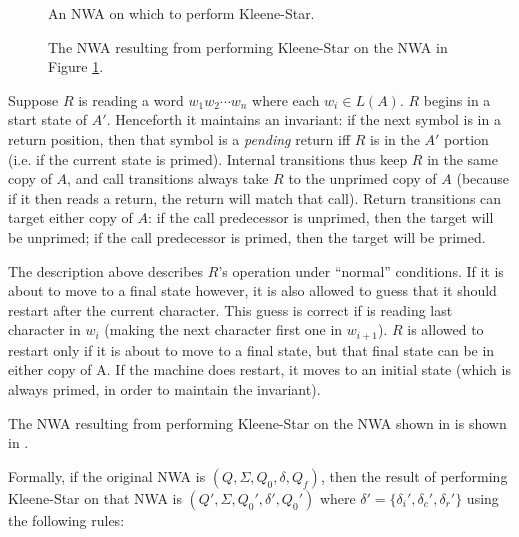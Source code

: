 \begin{figure}[p]
  \centering
  \caption{An NWA on which to perform Kleene-Star.}
  \label{Fi:Star1}
\end{figure}

\begin{figure}[p]
  \centering
  \caption{The NWA resulting from performing Kleene-Star on the NWA in Figure \ref{Fi:Star1}.}
  \label{Fi:Star2}
\end{figure}
\antistupidfloats


Suppose $R$ is reading a word $w_1w_2\cdots w_n$ where each $w_i \in
L(A)$. $R$ begins in a start state of $A'$. Henceforth it maintains an
invariant: if the next symbol is in a return position, then that symbol is a
\emph{pending} return iff $R$ is in the $A'$ portion (i.e. if the current state is
primed). Internal transitions thus keep $R$ in the same copy of $A$, and call
transitions always take $R$ to the unprimed copy of $A$ (because if it then
reads a return, the return will match that call). Return transitions can
target either copy of $A$: if the call predecessor is unprimed, then the
target will be unprimed; if the call predecessor is primed, then the target
will be primed.

The description above describes $R$'s operation under ``normal''
conditions. If it is about to move to a final state however, it is also allowed to guess that it
should restart after the current character. This guess is correct if is
reading last character in $w_i$
(making the next character first one in $w_{i+1}$). $R$ is allowed to
restart only if it is about to move to a final state, but that final state
can be in either copy of A. If the machine
does restart, it moves to an initial state (which is always primed, in order to
maintain the invariant).

The NWA resulting from performing Kleene-Star on the NWA shown in
 is shown in .

Formally, if the original NWA is $(Q, \Sigma, Q_0, \delta, Q_f)$,
then the result of performing Kleene-Star on that NWA is $(Q', \Sigma,
Q_0', \delta', Q_0')$ where $\delta' =
\{\delta_i',\delta_c',\delta_r'\}$ using the following rules:

